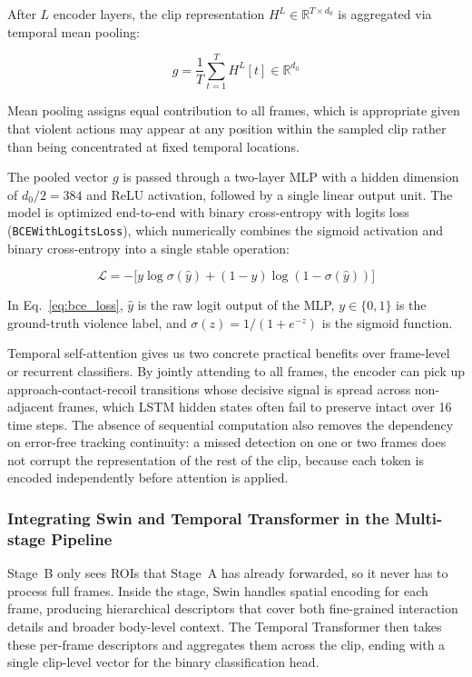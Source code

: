 \documentclass[conference]{IEEEtran}
\begin{document}
After $L$ encoder layers, the clip representation $H^L \in \mathbb{R}^{T \times d_0}$ is aggregated via temporal mean pooling:

\begin{equation}
g = \frac{1}{T} \sum_{t=1}^{T} H^L[t] \in \mathbb{R}^{d_0}
\label{eq:temporal_pooling}
\end{equation}

\noindent Mean pooling assigns equal contribution to all frames, which is appropriate given that violent actions may appear at any position within the sampled clip rather than being concentrated at fixed temporal locations.

The pooled vector $g$ is passed through a two-layer MLP with a hidden dimension of $d_0 / 2 = 384$ and ReLU activation, followed by a single linear output unit. The model is optimized end-to-end with binary cross-entropy with logits loss (\texttt{BCEWithLogitsLoss}), which numerically combines the sigmoid activation and binary cross-entropy into a single stable operation:

\begin{equation}
\mathcal{L} = -\bigl[y \log \sigma(\hat{y}) + (1 - y) \log (1 - \sigma(\hat{y}))\bigr]
\label{eq:bce_loss}
\end{equation}

\noindent In Eq.~\ref{eq:bce_loss}, $\hat{y}$ is the raw logit output of the MLP, $y \in \{0, 1\}$ is the ground-truth violence label, and $\sigma(z) = 1/(1+e^{-z})$ is the sigmoid function.

Temporal self-attention gives us two concrete practical benefits over frame-level or recurrent classifiers. By jointly attending to all frames, the encoder can pick up approach-contact-recoil transitions whose decisive signal is spread across non-adjacent frames, which LSTM hidden states often fail to preserve intact over 16 time steps. The absence of sequential computation also removes the dependency on error-free tracking continuity: a missed detection on one or two frames does not corrupt the representation of the rest of the clip, because each token is encoded independently before attention is applied.

\subsubsection{Integrating Swin and Temporal Transformer in the Multi-stage Pipeline}

Stage~B only sees ROIs that Stage~A has already forwarded, so it never has to process full frames. Inside the stage, Swin handles spatial encoding for each frame, producing hierarchical descriptors that cover both fine-grained interaction details and broader body-level context. The Temporal Transformer then takes these per-frame descriptors and aggregates them across the clip, ending with a single clip-level vector for the binary classification head.
\end{document}
